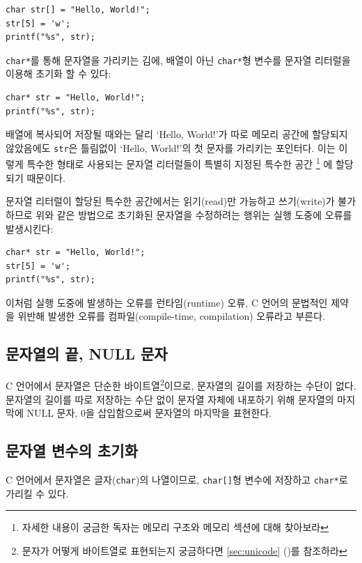 \documentclass[a4paper,12pt]{book}
\newcommand{\V}[1]{\Verb|#1|}
\newcommand*{\fullref}[1]{\autoref{#1} (\nameref*{#1})}
\begin{document}
    \begin{lstlisting}
char str[] = "Hello, World!";
str[5] = 'w';
printf("%s", str);
    \end{lstlisting}

    \V{char*}를 통해 문자열을 가리키는 김에,
    배열이 아닌 \V{char*}형 변수를 문자열 리터럴을 이용해 초기화 할 수 있다:
    
    \begin{lstlisting}
char* str = "Hello, World!";
printf("%s", str);
    \end{lstlisting}

    배열에 복사되어 저장될 때와는 달리 `Hello, World!'가 따로 메모리 공간에 할당되지 않았음에도
    \V{str}은 틀림없이 `Hello, World!'의 첫 문자를 가리키는 포인터다.
    이는 이렇게 특수한 형태로 사용되는 문자열 리터럴들이 특별히 지정된 특수한 공간
    \footnote{자세한 내용이 궁금한 독자는 메모리 구조와 메모리 섹션에 대해 찾아보라}
    에 할당되기 때문이다.
    
    문자열 리터럴이 할당된 특수한 공간에서는 읽기(read)만 가능하고 쓰기(write)가 불가하므로
    위와 같은 방법으로 초기화된 문자열을 수정하려는 행위는 실행 도중에 오류를 발생시킨다:

    \begin{lstlisting}
char* str = "Hello, World!";
str[5] = 'w';
printf("%s", str);
    \end{lstlisting}

    이처럼 실행 도중에 발생하는 오류를 런타임(runtime) 오류,
    C 언어의 문법적인 제약을 위반해 발생한 오류를 컴파일(compile-time, compilation) 오류라고 부른다.

    \subsection{문자열의 끝, NULL 문자}

        C 언어에서 문자열은 단순한 바이트열\footnote{
            문자가 어떻게 바이트열로 표현되는지 궁금하다면 \fullref{sec:unicode}를 참조하라
        }이므로,
        문자열의 길이를 저장하는 수단이 없다.
        문자열의 길이를 따로 저장하는 수단 없이 문자열 자체에 내포하기 위해
        문자열의 마지막에 NULL 문자, 0을 삽입함으로써 문자열의 마지막을 표현한다.

    \subsection{문자열 변수의 초기화}

        C 언어에서 문자열은 글자(\V{char})의 나열이므로,
        \V{char[]}형 변수에 저장하고 \V{char*}로 가리킬 수 있다.
\end{document}
